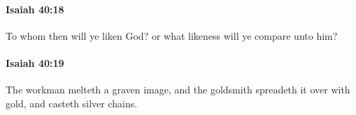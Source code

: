 		\paragraph{Isaiah 40:18} %
			\label{ISAIAH-40-18}

			To whom then will ye liken God? or what likeness will ye compare unto him?


		\paragraph{Isaiah 40:19} %
			\label{ISAIAH-40-19}

			The workman melteth a graven image, and the goldsmith spreadeth it over with gold, and casteth silver chains.



